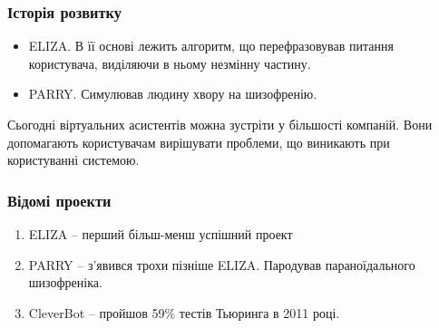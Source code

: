 \documentclass{beamer}
\begin{document}
\begin{frame}
    \frametitle{Історія розвитку}
    \begin{itemize}
        \item ELIZA.
        В її основі лежить алгоритм, що перефразовував питання користувача, виділяючи в ньому незмінну частину.

        \item PARRY.
        Симулював людину хвору на шизофренію.
    \end{itemize}

    Сьогодні віртуальних асистентів можна зустріти у більшості компаній. Вони допомагають користувачам вирішувати проблеми, що виникають при користуванні системою.
\end{frame}

\begin{frame}
    \frametitle{Відомі проекти}

    \begin{enumerate}
        \item ELIZA -- перший більш-менш успішний проект
        \item PARRY -- з'явився трохи пізніше ELIZA. Пародував параноїдального шизофреніка.
        \item CleverBot -- пройшов 59\% тестів Тьюринга в 2011 році.
    \end{enumerate}

\end{frame}
\end{document}
